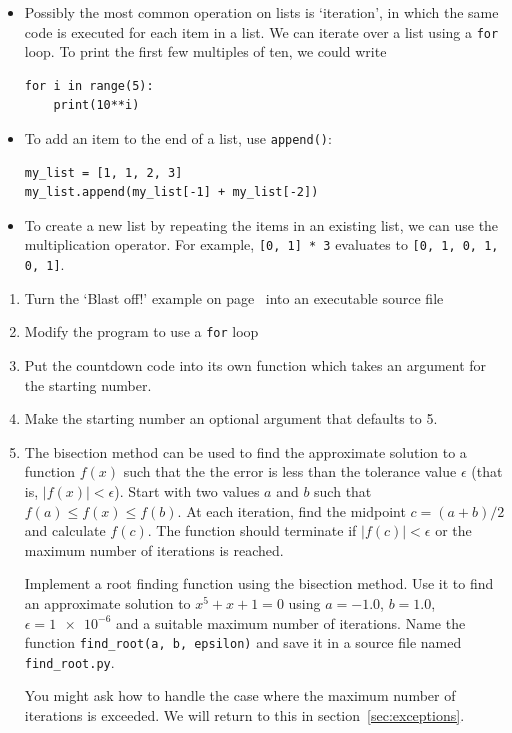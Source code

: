 \documentclass[a4paper,twoside,titlepage]{memoir}
\makeatletter
\newcommand{\FrameTitle}[2]{%
  \fboxrule=\FrameRule \fboxsep=\FrameSep
  \fbox{\vbox{\nobreak \vskip -0.7\FrameSep
    \rlap{\centerline{\strut#1}}\nobreak\nointerlineskip%
    \vskip 0.7\FrameSep
    \hbox{#2}}}}
\newenvironment{framewithtitle}[2][\FrameFirst@Lab\ (cont.)]{%
  \def\FrameFirst@Lab{\textbf{#2}}%
  \def\FrameCont@Lab{\textbf{#1}}%
  \def\FrameCommand##1{%
    \FrameTitle{\FrameFirst@Lab}{##1}}%
  \def\FirstFrameCommand##1{%
    \FrameTitle{\FrameFirst@Lab}{##1}}%
  \def\MidFrameCommand##1{%
    \FrameTitle{\FrameCont@Lab}{##1}}%
  \def\LastFrameCommand##1{%
    \FrameTitle{\FrameCont@Lab}{##1}}%
\MakeFramed{\advance\hsize-\width \FrameRestore}}%
{\endMakeFramed}
\newcounter{exercisectr}
\newenvironment{exercise}
{\stepcounter{exercisectr}\begin{framewithtitle}{Practical \arabic{exercisectr}}}
{\end{framewithtitle}}
\newcommand{\shellcmd}{\texttt}
\makeatother
\begin{document}
\begin{itemize}
\item Possibly the most common operation on lists is `iteration', in which the same code is executed for each item in a list.  We can iterate over a list using a \shellcmd{for} loop.  To print the first few multiples of ten, we could write
\index{range@\shellcmd{range()}}
\begin{verbatim}
for i in range(5):
	print(10**i)
\end{verbatim}
\item To add an item to the end of a list, use \shellcmd{append()}:
\begin{verbatim}
my_list = [1, 1, 2, 3]
my_list.append(my_list[-1] + my_list[-2])
\end{verbatim}
\item To create a new list by repeating the items in an existing list, we can use the multiplication operator.  For example, \shellcmd{[0, 1] * 3} evaluates to \shellcmd{[0, 1, 0, 1, 0, 1]}.
\end{itemize}

\begin{exercise}
\begin{enumerate}
\item Turn the `Blast off!' example on page~\pageref{blast-off} into an executable source file

\item Modify the program to use a \shellcmd{for} loop

\item Put the countdown code into its own function which takes an argument for the starting number.

\item Make the starting number an optional argument that defaults to 5.

\item The bisection method can be used to find the approximate solution to a function $f(x)$ such that the the error is less than the tolerance value $\epsilon$ (that is, $| f(x) | < \epsilon$).  Start with two values $a$ and $b$ such that $f(a) \leq f(x) \leq f(b)$.  At each iteration, find the midpoint $c = \left(a + b\right) / 2$ and calculate $f(c)$.  The function should terminate if $| f(c) | < \epsilon$ or the maximum number of iterations is reached.

Implement a root finding function using the bisection method.  Use it to find an approximate solution to $x^5 + x + 1 = 0$ using $a = -1.0$, $b = 1.0$, $\epsilon = \num{1e-6}$ and a suitable maximum number of iterations.  Name the function \shellcmd{find\_root(a, b, epsilon)} and save it in a source file named \shellcmd{find\_root.py}.

You might ask how to handle the case where the maximum number of iterations is exceeded.  We will return to this in section~\ref{sec:exceptions}.
\end{enumerate}
\end{exercise}
\end{document}
